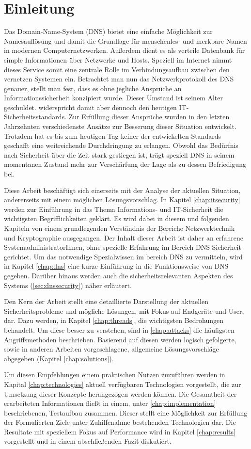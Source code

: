 \chapter{Einleitung}
Das Domain-Name-System (DNS) bietet eine einfache Möglichkeit zur Namesauflösung und damit die Grundlage für menschenles- und merkbare Namen in modernen Computernetzwerken. Außerdem dient es als verteile Datenbank für simple Informationen über Netzwerke und Hosts. Speziell im Internet nimmt dieses Service somit eine zentrale Rolle im Verbindungsaufbau zwischen den vernetzen Systemen ein. Betrachtet man nun das Netzwerkprotokoll des DNS genauer, stellt man fest, dass es ohne jegliche Ansprüche an Informationssicherheit konzipiert wurde. Dieser Umstand ist seinem Alter geschuldet. widerspricht damit aber dennoch den heutigen IT-Sicherheitsstandards. Zur Erfüllung dieser Ansprüche wurden in den letzten Jahrzehnten verschiedenste Ansätze zur Besserung dieser Situation entwickelt. Trotzdem hat es bis zum heutigen Tag keiner der entwickelten Standards geschafft eine weitreichende Durchdringung zu erlangen. Obwohl das Bedürfnis nach Sicherheit über die Zeit stark gestiegen ist, trägt speziell DNS in seinem momentanen Zustand mehr zur Verschärfung der Lage als zu dessen Befriedigung bei.

Diese Arbeit beschäftigt sich einerseits mit der Analyse der aktuellen Situation, andererseits mit einem möglichen Lösungsvorschlag. In Kapitel \ref{chap:itsecurity} werden zur Einführung in das Thema Informations- und IT-Sicherheit die wichtigsten Begrifflichkeiten geklärt. Es wird dabei in diesem und folgenden Kapiteln von einem grundlegenden Verständnis der Bereiche Netzwerktechnik und Kryptographie ausgegangen. Der Inhalt dieser Arbeit ist daher an erfahrene SystemadministratorInnen, ohne spezielle Erfahrung im Bereich DNS-Sicherheit gerichtet. Um das notwendige Spezialwissen im bereich DNS zu vermitteln, wird in Kapitel \ref{chap:dns} eine kurze Einführung in die Funktionsweise von DNS gegeben. Darüber hinaus werden auch die sicherheitsrelevanten Aspekten des Systems (\ref{sec:dnssecurity}) näher erläutert. 

Den Kern der Arbeit stellt eine detaillierte Darstellung der aktuellen Sicherheitsprobleme und mögliche Lösungen, mit Fokus auf Endgeräte und User, dar. Dazu werden, in Kapitel \ref{chap:threads}, die wichtigsten Bedrohungen behandelt. Um diese besser zu verstehen, sind in \ref{chap:attacks} die häufigsten Angriffsmethoden beschrieben. Basierend auf diesen werden logisch gefolgerte, sowie in anderen Arbeiten vorgeschlagene, allgemeine Lösungsvorschläge abgegeben (Kapitel \ref{chap:solutions}). 

Um diesen Empfehlungen einem praktischen Nutzen zuzuführen werden in Kapital \ref{chap:technologies} aktuell verfügbaren Technologien vorgestellt, die zur Umsetzung dieser Konzepte herangezogen werden können. Die Gesamtheit der erarbeiteten Informationen fließt in einem, unter \ref{chap:implementation} beschriebenen, Testaufbau zusammen. Dieser stellt eine Möglichkeit zur Erfüllung der Formulierten Ziele unter Zuhilfenahme bestehenden Technologien dar. Die Resultate mit speziellem Fokus auf Performance wird in Kapitel \ref{chap:results} vorgestellt und in einem abschließenden Fazit diskutiert.
